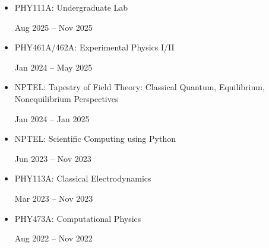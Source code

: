 \documentclass[10pt,a4paper]{article}
\begin{document}
\begin{itemize}[leftmargin=1.5em, itemsep=3.5pt, parsep=0pt]
  \item \begin{minipage}[t]{0.80\linewidth}
          PHY111A: Undergraduate Lab
        \end{minipage}%
        \begin{minipage}[t]{0.20\linewidth}
          \raggedleft
          Aug 2025 -- Nov 2025
        \end{minipage}

  \item \begin{minipage}[t]{0.80\linewidth}
          PHY461A/462A: Experimental Physics I/II
        \end{minipage}%
        \begin{minipage}[t]{0.20\linewidth}
          \raggedleft
          Jan 2024 -- May 2025
        \end{minipage}

  \item \begin{minipage}[t]{0.80\linewidth}
          NPTEL: Tapestry of Field Theory: Classical Quantum, Equilibrium, Nonequilibrium Perspectives
        \end{minipage}%
        \begin{minipage}[t]{0.20\linewidth}
          \raggedleft
          Jan 2024 -- Jan 2025
        \end{minipage}

  \item \begin{minipage}[t]{0.80\linewidth}
          NPTEL: Scientific Computing using Python
        \end{minipage}%
        \begin{minipage}[t]{0.20\linewidth}
          \raggedleft
          Jun 2023 -- Nov 2023
        \end{minipage}

  \item \begin{minipage}[t]{0.80\linewidth}
          PHY113A: Classical Electrodynamics
        \end{minipage}%
        \begin{minipage}[t]{0.20\linewidth}
          \raggedleft
          Mar 2023 -- Nov 2023
        \end{minipage}

  \item \begin{minipage}[t]{0.80\linewidth}
          PHY473A: Computational Physics
        \end{minipage}%
        \begin{minipage}[t]{0.20\linewidth}
          \raggedleft
          Aug 2022 -- Nov 2022
        \end{minipage}


\end{itemize}
\end{document}
